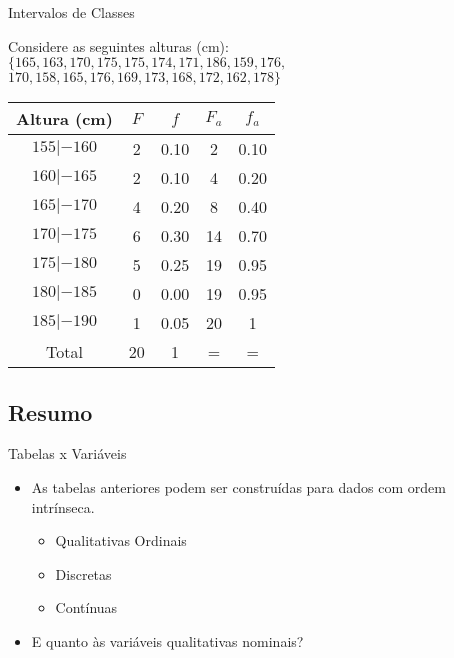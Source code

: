 \documentclass{beamer}
\begin{document}
\begin{frame}{Intervalos de Classes}

  Considere as seguintes alturas (cm):
$ \{ 165,163,170,175,175,174,171,186,159,176,$
$170,158,165,176,169,173,168,172,162,178 \} $

\centering\begin{tabular}{|c|c|c|c|c|}
  \hline
  Altura (cm) & $F$ & $f$ & $F_a$ & $f_a$ \\
  \hline
  $155 |- 160$ & 2 & 0.10 & 2 & 0.10\\%
  $160 |- 165$ & 2 & 0.10 & 4 & 0.20\\%
  $165 |- 170$ & 4 & 0.20 & 8 & 0.40\\%
  $170 |- 175$ & 6 & 0.30 & 14 & 0.70\\%
  $175 |- 180$ & 5 & 0.25 & 19 & 0.95\\%
  $180 |- 185$ & 0 & 0.00 & 19 & 0.95\\%
  $185 |- 190$ & 1 & 0.05 & 20 & 1\\%
  \hline
  \hline
  Total & 20 & 1 & = & =\\
  \hline
\end{tabular}

\end{frame}
\subsection{Resumo}

\begin{frame}{Tabelas x Variáveis}
  \begin{itemize}
  \item As tabelas anteriores podem ser construídas para dados com
    ordem intrínseca.
    \begin{itemize}
    \item Qualitativas Ordinais
    \item Discretas
    \item Contínuas
    \end{itemize}
  \item E quanto às variáveis qualitativas nominais?
  \end{itemize}
  
\end{frame}
\end{document}
